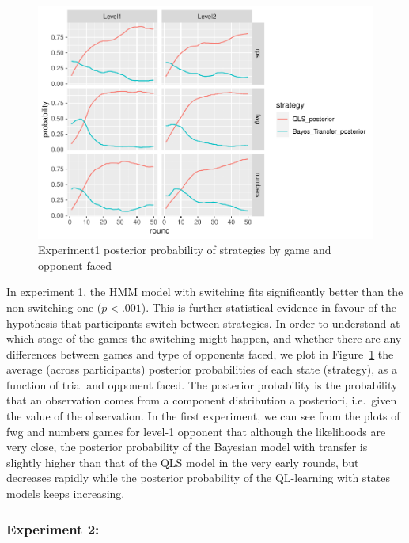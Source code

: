 \documentclass[man,floatsintext]{apa6}
\begin{document}
\begin{figure}

{\centering \includegraphics{draft_report_v3_files/figure-latex/exp1-posteriors-plot-1} 

}

\caption{Experiment1 posterior probability of strategies by game and opponent faced}\label{fig:exp1-posteriors-plot}
\end{figure}

In experiment 1, the HMM model with switching fits significantly better than the non-switching one (\(p < .001\)). This is further statistical evidence in favour of the hypothesis that participants switch between strategies. In order to understand at which stage of the games the switching might happen, and whether there are any differences between games and type of opponents faced, we plot in Figure~\ref{fig:exp1-posteriors-plot} the average (across participants) posterior probabilities of each state (strategy), as a function of trial and opponent faced. The posterior probability is the probability that an observation comes from a component distribution a posteriori, i.e.~given the value of the observation. In the first experiment, we can see from the plots of fwg and numbers games for level-1 opponent that although the likelihoods are very close, the posterior probability of the Bayesian model with transfer is slightly higher than that of the QLS model in the very early rounds, but decreases rapidly while the posterior probability of the QL-learning with states models keeps increasing.

\hypertarget{experiment-2-1}{%
\subsubsection{Experiment 2:}\label{experiment-2-1}}
\end{document}
